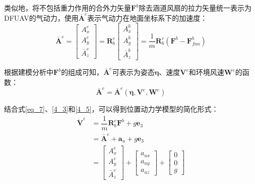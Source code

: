 类似地，将不包括重力作用的合外力矢量$\boldsymbol{F}^b$除去涵道风扇的拉力矢量统一表示为DFUAV的气动力，使用$\bar{\boldsymbol{A}}^e$表示气动力在地面坐标系下的加速度：
\begin{equation}
    \bar{\boldsymbol{A}}^e=
    \begin{bmatrix}
    A_x^e \\
    A_y^e \\
    \bar{A}_z^e
    \end{bmatrix}=\boldsymbol{R}_b^e
    \begin{bmatrix}
    A_x^b \\
    A_y^b \\
    \bar{A}_z^b
    \end{bmatrix}=\frac{1}{m}\boldsymbol{R}_b^e(\boldsymbol{F}^b-\boldsymbol{F}^b_{fan})
    \label{4_4}
\end{equation}

根据建模分析中$\boldsymbol{F}^b$的组成可知，$\bar{\boldsymbol{A}}^e$可表示为姿态$\boldsymbol{\eta}$、速度$\boldsymbol{V}^e$和环境风速$\boldsymbol{W}^e$的函数：
\begin{equation}
    \bar{\boldsymbol{A}}^e=\bar{\boldsymbol{A}}^e(\boldsymbol{\eta},\boldsymbol{V}^e,\boldsymbol{W}^e)
    \label{4_5}
\end{equation}

结合式\eqref{eq_7}、\eqref{4_3}和\eqref{4_5}，可以得到位置动力学模型的简化形式：
\begin{equation}
    \begin{aligned}
        \dot{\boldsymbol{V}}^e&=\dfrac{1}{m}\boldsymbol{R}_b^e\boldsymbol{F}^b+g\boldsymbol{e}_3\\
        &=\bar{\boldsymbol{A}}^e+\boldsymbol{a}_u+g\boldsymbol{e}_3\\
        &=  \begin{bmatrix}A_x^e \\A_y^e \\\bar{A}_z^e\end{bmatrix}+
        \begin{bmatrix}a_{ux} \\a_{uy} \\a_{uz}\end{bmatrix}+
        \begin{bmatrix}0 \\0 \\g\end{bmatrix}
    \end{aligned}
    \label{4_6}
\end{equation}

